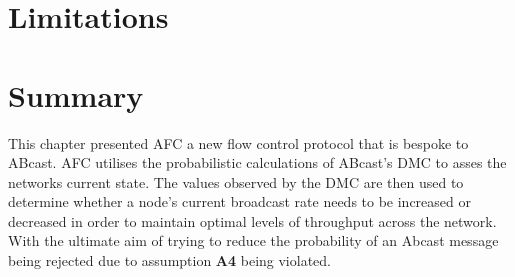 \section{Limitations}

\section{Summary}
This chapter presented AFC a new flow control protocol that is bespoke to \textsf{ABcast}.  AFC utilises the probabilistic calculations of \textsf{ABcast}'s DMC to asses the networks current state.  The values observed by the DMC are then used to determine whether a node's current broadcast rate needs to be increased or decreased in order to maintain optimal levels of throughput across the network.  With the ultimate aim of trying to reduce the probability of an \textsf{Abcast} message being rejected due to assumption \textbf{A4} being violated.    